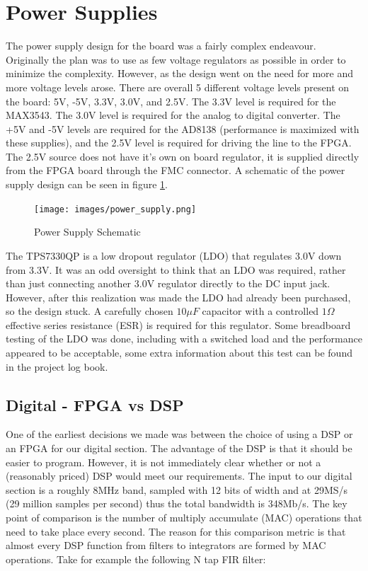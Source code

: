 \documentclass[a4paper, 12pt, notitlepage]{article}
\begin{document}
\section{Power Supplies}
The power supply design for the board was a fairly complex endeavour.  Originally the plan was to use as few voltage regulators as possible in order to minimize the complexity.  However, as the design went on the need for more and more voltage levels arose.  There are overall 5 different voltage levels present on the board: 5V, -5V, 3.3V, 3.0V, and 2.5V.  The 3.3V level is required for the MAX3543.  The 3.0V level is required for the analog to digital converter.  The +5V and -5V levels are required for the AD8138 (performance is maximized with these supplies), and the 2.5V level is required for driving the line to the FPGA.  The 2.5V source does not have it's own on board regulator, it is supplied directly from the FPGA board through the FMC connector.  A schematic of the power supply design can be seen in figure \ref{fig:power_supply}.


\begin{figure}
  \texttt{[image: images/power\_supply.png]}
  \caption{Power Supply Schematic}
  \label{fig:power_supply}
\end{figure}

The TPS7330QP is a low dropout regulator (LDO) that regulates 3.0V down from 3.3V.  It was an odd oversight to think that an LDO was required, rather than just connecting another 3.0V regulator directly to the DC input jack.  However, after this realization was made the LDO had already been purchased, so the design stuck.  A carefully chosen $10\mu F$ capacitor with a controlled $1\Omega$ effective series resistance (ESR) is required for this regulator.  Some breadboard testing of the LDO was done, including with a switched load and the performance appeared to be acceptable, some extra information about this test can be found in the project log book.


\subsection{Digital - FPGA vs DSP}
One of the earliest decisions we made was between the choice of using a DSP or an FPGA for our digital section.  The advantage of the DSP is that it should be easier to program.  However, it is not immediately clear whether or not a (reasonably priced) DSP would meet our requirements.  The input to our digital section is a roughly 8MHz band, sampled with 12 bits of width and at 29MS/s (29 million samples per second) thus the total bandwidth is 348Mb/s.  The key point of comparison is the number of multiply accumulate (MAC) operations that need to take place every second.  The reason for this comparison metric is that almost every DSP function from filters to integrators are formed by MAC operations.  Take for example the following N tap FIR filter:
\end{document}
